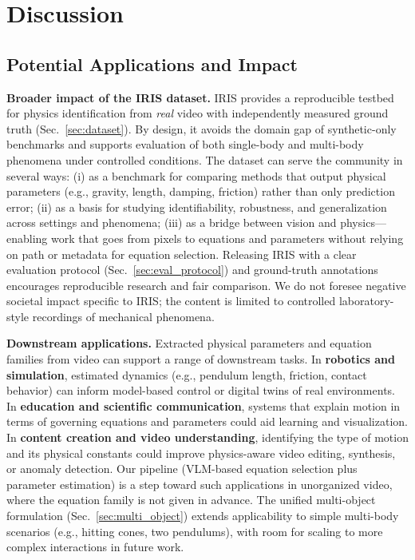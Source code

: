\section{Discussion}
\label{sec:discussion}

\subsection{Potential Applications and Impact}
\label{sec:applications}

\textbf{Broader impact of the IRIS dataset.} IRIS provides a reproducible testbed for physics identification from \emph{real} video with independently measured ground truth (Sec.~\ref{sec:dataset}). By design, it avoids the domain gap of synthetic-only benchmarks and supports evaluation of both single-body and multi-body phenomena under controlled conditions. The dataset can serve the community in several ways: (i) as a benchmark for comparing methods that output physical parameters (e.g., gravity, length, damping, friction) rather than only prediction error; (ii) as a basis for studying identifiability, robustness, and generalization across settings and phenomena; (iii) as a bridge between vision and physics—enabling work that goes from pixels to equations and parameters without relying on path or metadata for equation selection. Releasing IRIS with a clear evaluation protocol (Sec.~\ref{sec:eval_protocol}) and ground-truth annotations encourages reproducible research and fair comparison. We do not foresee negative societal impact specific to IRIS; the content is limited to controlled laboratory-style recordings of mechanical phenomena.

\textbf{Downstream applications.} Extracted physical parameters and equation families from video can support a range of downstream tasks. In \textbf{robotics and simulation}, estimated dynamics (e.g., pendulum length, friction, contact behavior) can inform model-based control or digital twins of real environments. In \textbf{education and scientific communication}, systems that explain motion in terms of governing equations and parameters could aid learning and visualization. In \textbf{content creation and video understanding}, identifying the type of motion and its physical constants could improve physics-aware video editing, synthesis, or anomaly detection. Our pipeline (VLM-based equation selection plus parameter estimation) is a step toward such applications in unorganized video, where the equation family is not given in advance. The unified multi-object formulation (Sec.~\ref{sec:multi_object}) extends applicability to simple multi-body scenarios (e.g., hitting cones, two pendulums), with room for scaling to more complex interactions in future work.

